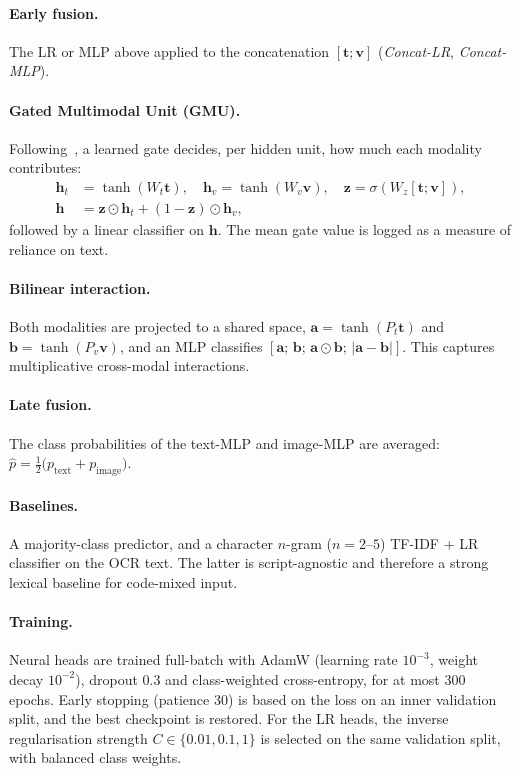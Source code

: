\paragraph{Early fusion.}
The LR or MLP above applied to the concatenation $[\mathbf{t};\mathbf{v}]$ (\emph{Concat-LR}, \emph{Concat-MLP}).

\paragraph{Gated Multimodal Unit (GMU).}
Following~\cite{arevalo2017gmu}, a learned gate decides, per hidden unit, how much each modality contributes:
\begin{equation}
\begin{aligned}
\mathbf{h}_t&=\tanh(W_t\mathbf{t}),\quad \mathbf{h}_v=\tanh(W_v\mathbf{v}),\quad \mathbf{z}=\sigma\!\left(W_z[\mathbf{t};\mathbf{v}]\right),\\
\mathbf{h}&=\mathbf{z}\odot\mathbf{h}_t+(1-\mathbf{z})\odot\mathbf{h}_v ,
\end{aligned}
\end{equation}
followed by a linear classifier on $\mathbf{h}$. The mean gate value is logged as a measure of reliance on text.

\paragraph{Bilinear interaction.}
Both modalities are projected to a shared space, $\mathbf{a}=\tanh(P_t\mathbf{t})$ and
$\mathbf{b}=\tanh(P_v\mathbf{v})$, and an MLP classifies
$[\mathbf{a};\,\mathbf{b};\,\mathbf{a}\odot\mathbf{b};\,|\mathbf{a}-\mathbf{b}|]$. This captures multiplicative
cross-modal interactions.

\paragraph{Late fusion.}
The class probabilities of the text-MLP and image-MLP are averaged:
$\hat{p}=\tfrac12\big(p_{\text{text}}+p_{\text{image}}\big)$.

\paragraph{Baselines.}
A majority-class predictor, and a character $n$-gram ($n=2$--$5$) TF-IDF + LR classifier on the OCR text. The latter
is script-agnostic and therefore a strong lexical baseline for code-mixed input.

\paragraph{Training.}
Neural heads are trained full-batch with AdamW (learning rate $10^{-3}$, weight decay $10^{-2}$), dropout $0.3$ and
class-weighted cross-entropy, for at most 300 epochs. Early stopping (patience 30) is based on the loss on an inner
validation split, and the best checkpoint is restored. For the LR heads, the inverse regularisation strength
$C\in\{0.01,0.1,1\}$ is selected on the same validation split, with balanced class weights.

